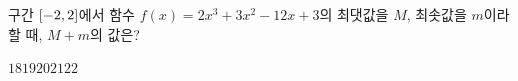구간 $[-2{,}\mkern3mu\mathopen{}2]$에서 함수 $f(x)=2x^3+3x^2-12x+3$의 최댓값을 $M$, 최솟값을 $m$이라 할 때, $M+m$의 값은?
\begin{choices32}{$18$}{$19$}{$20$}{$21$}{$22$}\end{choices32}
